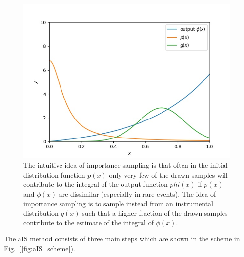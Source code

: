 \documentclass[a4paper,fleqn,usenatbib]{mnras}
\begin{document}
\begin{figure}
	\includegraphics[width=\columnwidth]{intuitive.jpg}
    \caption{The intuitive idea of importance sampling is that often in the initial distribution function $p(x)$ only very few of the drawn samples will contribute to  the integral of the output function $phi(x)$ if $p(x)$ and $\phi(x)$ are dissimilar (especially in rare events). The idea of importance sampling is to sample instead from an instrumental distribution $g(x)$ such that a higher fraction of the drawn samples contribute to the estimate of the integral of $\phi(x)$. }
    \label{fig:example_figure}
    \label{fig:intuitive}
\end{figure}




The aIS method consists of three main steps which are shown in the scheme in Fig.~(\ref{fig:aIS_scheme}). 
\end{document}
